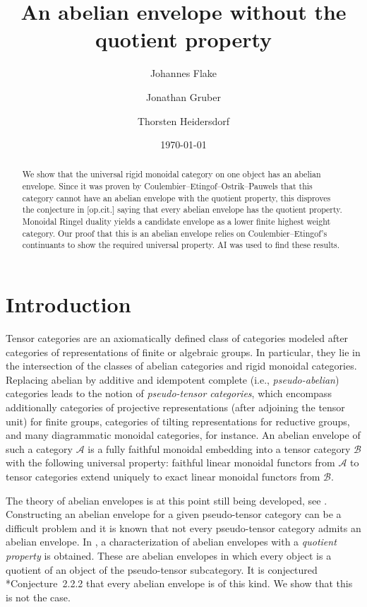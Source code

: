 \documentclass[11pt,oneside]{amsart}
\title{An abelian envelope without the quotient property}
\author{Johannes Flake}
\author{Jonathan Gruber}
\author{Thorsten Heidersdorf}
\date{\today}
\theoremstyle{definition}
\theoremstyle{remark}
\newcommand\cA{\mathcal A}
\newcommand\cB{\mathcal B}
\renewcommand\:\colon
\begin{document}
\begin{abstract}
We show that the universal rigid monoidal category on one object has an abelian envelope.
Since it was proven by Coulembier--Etingof--Ostrik--Pauwels \cite{CEOP} that this category cannot have an abelian envelope with the quotient property, this disproves the conjecture in [op.cit.] saying that every abelian envelope has the quotient property. Monoidal Ringel duality \cite{FG} yields a candidate envelope as a lower finite highest weight category.
Our proof that this is an abelian envelope relies on Coulembier--Etingof's \cite{CE} continuants to show the required universal property. AI was used to find these results.
\end{abstract}

\maketitle

\section{Introduction}

Tensor categories are an axiomatically defined class of categories modeled after categories of representations of finite or algebraic groups. In particular, they lie in the intersection of the classes of abelian categories and rigid monoidal categories. Replacing abelian by additive and idempotent complete (i.e., \emph{pseudo-abelian}) categories leads to the notion of \emph{pseudo-tensor categories}, which encompass additionally categories of projective representations (after adjoining the tensor unit) for finite groups, categories of tilting representations for reductive groups, and many diagrammatic monoidal categories, for instance. An abelian envelope of such a category $\cA$ is a fully faithful monoidal embedding into a tensor category $\cB$ with the following universal property: faithful linear monoidal functors from $\cA$ to tensor categories extend uniquely to exact linear monoidal functors from $\cB$.

The theory of abelian envelopes is at this point still being developed, see \cites{Cou,BEO,CEAH,CEOP,Cou-hom,FLP-abenv}. Constructing an abelian envelope for a given pseudo-tensor category can be a difficult problem and it is known that not every pseudo-tensor category admits an abelian envelope. In \cite{CEOP}, a characterization of abelian envelopes with a \emph{quotient property} is obtained. These are abelian envelopes in which every object is a quotient of an object of the pseudo-tensor subcategory. It is conjectured \cite{CEOP}*{Conjecture~2.2.2} that every abelian envelope is of this kind. We show that this is not the case.
\end{document}
